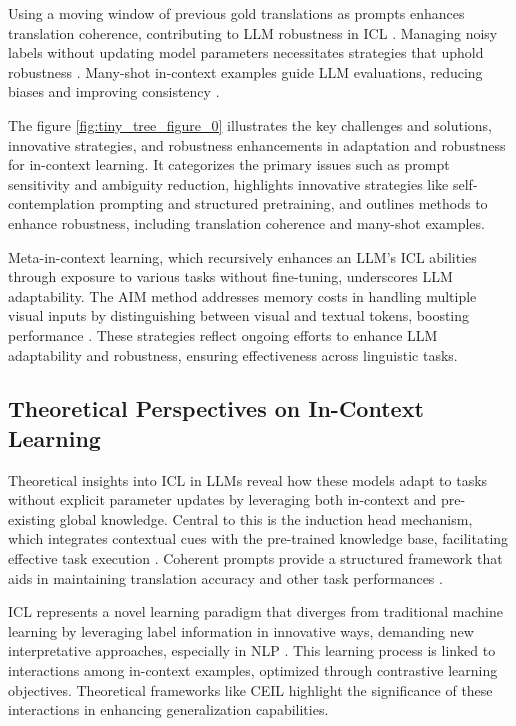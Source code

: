 Using a moving window of previous gold translations as prompts enhances translation coherence, contributing to LLM robustness in ICL \cite{sia2023incontextlearningmaintainingcoherency}. Managing noisy labels without updating model parameters necessitates strategies that uphold robustness \cite{kang2024incontextlearningnoisylabels}. Many-shot in-context examples guide LLM evaluations, reducing biases and improving consistency \cite{song2024can}.

The figure \autoref{fig:tiny_tree_figure_0} illustrates the key challenges and solutions, innovative strategies, and robustness enhancements in adaptation and robustness for in-context learning. It categorizes the primary issues such as prompt sensitivity and ambiguity reduction, highlights innovative strategies like self-contemplation prompting and structured pretraining, and outlines methods to enhance robustness, including translation coherence and many-shot examples.

Meta-in-context learning, which recursively enhances an LLM's ICL abilities through exposure to various tasks without fine-tuning, underscores LLM adaptability. The AIM method addresses memory costs in handling multiple visual inputs by distinguishing between visual and textual tokens, boosting performance \cite{gao2024aimletmultimodallarge}. These strategies reflect ongoing efforts to enhance LLM adaptability and robustness, ensuring effectiveness across linguistic tasks.
\subsection{Theoretical Perspectives on In-Context Learning} \label{subsec:Theoretical Perspectives on In-Context Learning}

Theoretical insights into ICL in LLMs reveal how these models adapt to tasks without explicit parameter updates by leveraging both in-context and pre-existing global knowledge. Central to this is the induction head mechanism, which integrates contextual cues with the pre-trained knowledge base, facilitating effective task execution \cite{wang2024understandingknowledgehijackmechanism}. Coherent prompts provide a structured framework that aids in maintaining translation accuracy and other task performances \cite{sia2023incontextlearningmaintainingcoherency}.

ICL represents a novel learning paradigm that diverges from traditional machine learning by leveraging label information in innovative ways, demanding new interpretative approaches, especially in NLP \cite{zhou2024detailtaskdemonstrationattribution,ExploringI0,zhou2024mysteryincontextlearningcomprehensive}. This learning process is linked to interactions among in-context examples, optimized through contrastive learning objectives. Theoretical frameworks like CEIL highlight the significance of these interactions in enhancing generalization capabilities.

